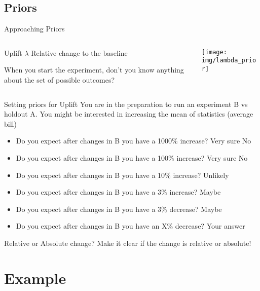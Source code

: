 \documentclass{beamer}
\begin{document}
\subsection{Priors}
\begin{frame}{Approaching Priors}
\begin{columns}
    \begin{column}{0.5\linewidth}
    \begin{block}{Uplift $\lambda$}
        Relative change to the baseline
    \end{block}
    When you start the experiment, don't you know anything about the set of possible outcomes?
    \end{column}
    \begin{column}{0.5\linewidth}
    \texttt{[image: img/lambda\_prior]}
    \end{column}
\end{columns}
\end{frame}
\begin{frame}{Setting priors for Uplift}
You are in the preparation to run an experiment B vs holdout A. You might be interested in increasing the mean of statistics (average bill)
\begin{itemize}
\pause
\item<+-> Do you expect after changes in B you have a 1000\% increase? Very sure No
\item<+-> Do you expect after changes in B you have a 100\% increase? Very sure No
\item<+-> Do you expect after changes in B you have a 10\% increase? Unlikely
\item<+-> Do you expect after changes in B you have a 3\% increase? Maybe
\item<+-> Do you expect after changes in B you have a 3\% decrease? Maybe
\item<+-> Do you expect after changes in B you have an X\% decrease? Your answer
\end{itemize}
\begin{alertblock}{Relative or Absolute change?}
    Make it clear if the change is relative or absolute!
\end{alertblock}
\end{frame}
\section{Example}
\end{document}
